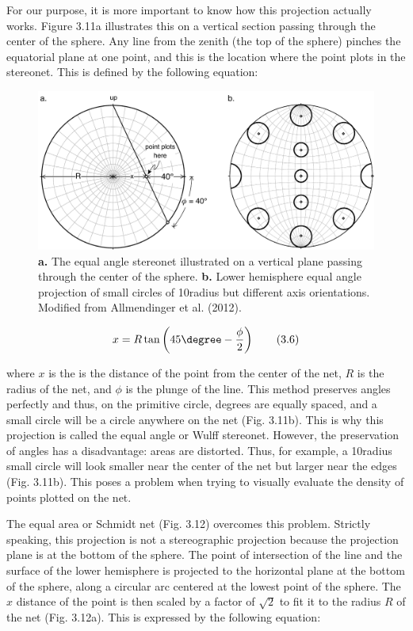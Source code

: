 \documentclass[a4paper , 12pt]{book}
\begin{document}
For our purpose, it is more important to know how this projection actually works. Figure 3.11a illustrates this on a vertical section passing through the center of the sphere. Any line from the zenith (the top of the sphere) pinches the equatorial plane at one point, and this is the location where the point plots in the stereonet. This is defined by the following equation:

\begin{figure}[ht]
    \centering
    \includegraphics[width=13cm]{ch3f11.pdf}
    \caption{\textbf{a.} The equal angle stereonet illustrated on a vertical plane passing through the center of the sphere. \textbf{b.} Lower hemisphere equal angle projection of small circles of 10\degree\space radius but different axis orientations. Modified from Allmendinger et al. (2012).}
\end{figure}

\begin{equation}
    x = R\tan\left(45\degree-\frac{\phi}{2}\right) \tag{3.6}
\end{equation}

where $x$ is the is the distance of the point from the center of the net, $R$ is the radius of the net, and $\phi$ is the plunge of the line. This method preserves angles perfectly and thus, on the primitive circle, degrees are equally spaced, and a small circle will be a circle anywhere on the net (Fig. 3.11b). This is why this projection is called the equal angle or Wulff stereonet. However, the preservation of angles has a disadvantage: areas are distorted. Thus, for example, a 10\degree\space radius small circle will look smaller near the center of the net but larger near the edges (Fig. 3.11b). This poses a problem when trying to visually evaluate the density of points plotted on the net.

The equal area or Schmidt net (Fig. 3.12) overcomes this problem. Strictly speaking, this projection is not a stereographic projection because the projection plane is at the bottom of the sphere. The point of intersection of the line and the surface of the lower hemisphere is projected to the horizontal plane at the bottom of the sphere, along a circular arc centered at the lowest point of the sphere. The $x$ distance of the point is then scaled by a factor of $\sqrt{2}$ to fit it to the radius $R$ of the net (Fig. 3.12a). This is expressed by the following equation:
\end{document}
